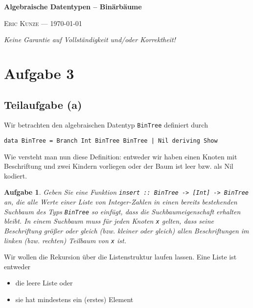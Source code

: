 \documentclass[ngerman, a4paper, 11pt]{article}
\theoremstyle{nonumberplain}
\newtheorem{aufgabe}{Aufgabe}
\newcommand*\ruleline[1]{\par\noindent\raisebox{.8ex}{\makebox[\linewidth]{\hrulefill\hspace{1ex}\raisebox{-.8ex}{#1}\hspace{1ex}\hrulefill}}}
\begin{document}
	\begin{center}
		{\bfseries \sffamily \huge Algebraische Datentypen -- Binärbäume} 
		
		\ruleline{\sffamily \Large Übungsblatt 2}
		
		{\scshape Eric Kunze --- \today}
	\end{center}
	\medskip
	
	{ \footnotesize \doclicenseThis }
	
	\begin{center}
		\small \slshape Keine Garantie auf Vollständigkeit und/oder Korrektheit!
	\end{center}
	
\section*{Aufgabe 3}
\subsection*{Teilaufgabe (a)}

Wir betrachten den algebraischen Datentyp \texttt{BinTree} definiert durch
\begin{lstlisting}[style=noframe]
	data BinTree = Branch Int BinTree BinTree | Nil deriving Show
\end{lstlisting}
Wie versteht man nun diese Definition: entweder wir haben einen Knoten mit Beschriftung und zwei Kindern vorliegen oder der Baum ist leer bzw. als Nil kodiert.

\begin{aufgabe}
	Geben Sie eine Funktion \texttt{insert :: BinTree -> [Int] -> BinTree} an, die alle Werte einer Liste von Integer-Zahlen in einen bereits bestehenden Suchbaum des Typs \texttt{BinTree} so einfügt, dass die Suchbaumeigenschaft erhalten bleibt. In einem Suchbaum muss für jeden Knoten \texttt{x} gelten, dass seine Beschriftung größer oder gleich (bzw. kleiner oder gleich) allen
	Beschriftungen im linken (bzw. rechten) Teilbaum von \texttt{x} ist.

\end{aufgabe}

Wir wollen die Rekursion über die Listenstruktur laufen lassen. Eine Liste ist entweder
\begin{itemize}[nolistsep, topsep=-\parskip]
	\item die leere Liste oder
	\item sie hat mindestens ein (erstes) Element
\end{itemize}
\end{document}
